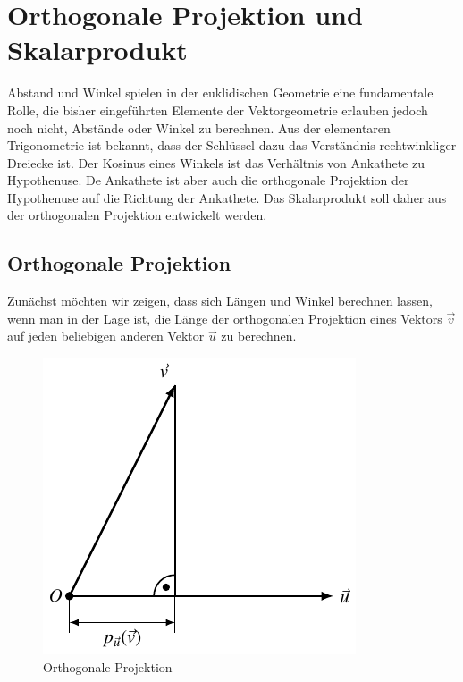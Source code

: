 %
%
%
\section{Orthogonale Projektion und Skalarprodukt\label{section:ortho-skalar}}
Abstand und Winkel spielen in der euklidischen Geometrie eine fundamentale
Rolle, die bisher eingeführten Elemente der Vektorgeometrie erlauben
jedoch noch nicht, Abstände oder Winkel zu berechnen.
Aus der elementaren Trigonometrie ist bekannt, dass der Schlüssel dazu
das Verständnis rechtwinkliger Dreiecke ist.
Der Kosinus eines Winkels ist das Verhältnis von Ankathete zu Hypothenuse.
De Ankathete ist aber auch die orthogonale Projektion der Hypothenuse
auf die Richtung der Ankathete.
Das Skalarprodukt soll daher aus der orthogonalen Projektion entwickelt
werden.

\subsection{Orthogonale Projektion\label{subsection:orthoproj}}
Zunächst möchten wir zeigen, dass sich Längen und Winkel berechnen
lassen, wenn man in der Lage ist, die Länge der orthogonalen Projektion
eines Vektors $\vec{v}$ auf jeden beliebigen anderen Vektor $\vec{u}$
zu berechnen.
\begin{figure}
\begin{center}
\includegraphics{4/images/projektion.pdf}
\end{center}
\caption{Orthogonale Projektion\label{orthproj}}
\end{figure}

